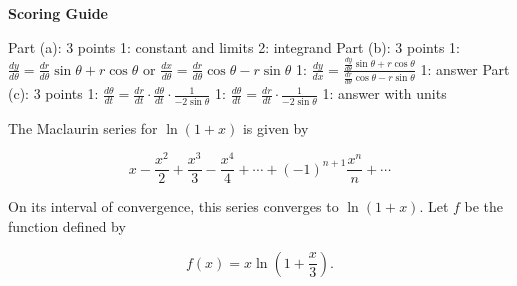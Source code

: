 \documentclass[12pt,addpoints,answers]{exam}
\begin{document}
\begin{questions}
\begin{solution}
\par\medskip
\textbf{Scoring Guide}\par
Part (a): 3 points 1: constant and limits 2: integrand Part (b): 3 points 1: $\frac{dy}{d\theta} = \frac{dr}{d\theta}\sin\theta + r\cos\theta$ or $\frac{dx}{d\theta} = \frac{dr}{d\theta}\cos\theta - r\sin\theta$ 1: $\frac{dy}{dx} = \frac{\frac{dy}{d\theta}\sin\theta + r\cos\theta}{\frac{dr}{d\theta}\cos\theta - r\sin\theta}$ 1: answer Part (c): 3 points 1: $\frac{d\theta}{dt} = \frac{dr}{dt} \cdot \frac{d\theta}{dt} \cdot \frac{1}{-2\sin\theta}$ 1: $\frac{d\theta}{dt} = \frac{dr}{dt} \cdot \frac{1}{-2\sin\theta}$ 1: answer with units
\end{solution}

\question
The Maclaurin series for $\ln(1 + x)$ is given by \par $$x - \frac{x^2}{2} + \frac{x^3}{3} - \frac{x^4}{4} + \cdots + (-1)^{n+1}\frac{x^n}{n} + \cdots$$ \par On its interval of convergence, this series converges to $\ln(1 + x)$. Let $f$ be the function defined by \par $$f(x) = x \ln\left(1 + \frac{x}{3}\right).$$
\end{questions}
\end{document}
